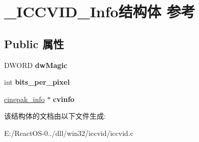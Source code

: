 \hypertarget{struct___i_c_c_v_i_d___info}{}\section{\+\_\+\+I\+C\+C\+V\+I\+D\+\_\+\+Info结构体 参考}
\label{struct___i_c_c_v_i_d___info}
\subsection*{Public 属性}
\begin{DoxyCompactItemize}
\item 
\mbox{\label{struct___i_c_c_v_i_d___info_adffd999c879d2aaf238f63eebc7546ec}} 
D\+W\+O\+RD {\bfseries dw\+Magic}
\item 
\mbox{\label{struct___i_c_c_v_i_d___info_ad6668ebb287abf1469f5846a5ab77ac8}} 
int {\bfseries bits\+\_\+per\+\_\+pixel}
\item 
\mbox{\label{struct___i_c_c_v_i_d___info_aec7d8a4eb3f9ebb31c6cf5a12f8a17c0}} 
\hyperlink{structcinepak__info}{cinepak\+\_\+info} $\ast$ {\bfseries cvinfo}
\end{DoxyCompactItemize}


该结构体的文档由以下文件生成\+:\begin{DoxyCompactItemize}
\item 
E\+:/\+React\+O\+S-\/0../dll/win32/iccvid/iccvid.\+c\end{DoxyCompactItemize}
